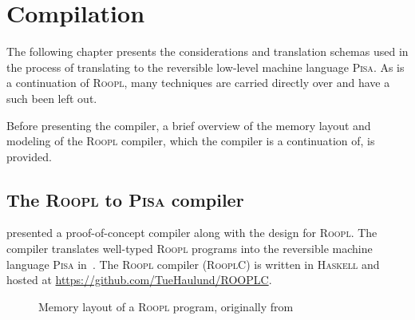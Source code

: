\chapter{Compilation}
\label{chp:compilation}
The following chapter presents the considerations and translation schemas used in the process of translating \rooplpp to the reversible low-level machine language \textsc{Pisa}. As \rooplpp is a continuation of \textsc{Roopl}, many techniques are carried directly over and have a such been left out.

Before presenting the \rooplpp compiler, a brief overview of the memory layout and modeling of the \textsc{Roopl} compiler, which the \rooplpp compiler is a continuation of, is provided. 

\section{The \textsc{Roopl} to \textsc{Pisa} compiler}
\label{sec:roopl-to-pisa-compiler}
\citeauthor{th:roopl} presented a proof-of-concept compiler along with the design for \textsc{Roopl}. The compiler translates well-typed \textsc{Roopl} programs into the reversible machine language \textsc{Pisa} in~\cite{th:roopl}. The \textsc{Roopl} compiler (\textsc{RooplC}) is written in \textsc{Haskell} and hosted at \url{https://github.com/TueHaulund/ROOPLC}.

\begin{figure}[ht]
    \centering
    \caption{Memory layout of a \textsc{Roopl} program, originally from~\cite{th:roopl}}
    \label{fig:roopl-memory-layout}
\end{figure}

